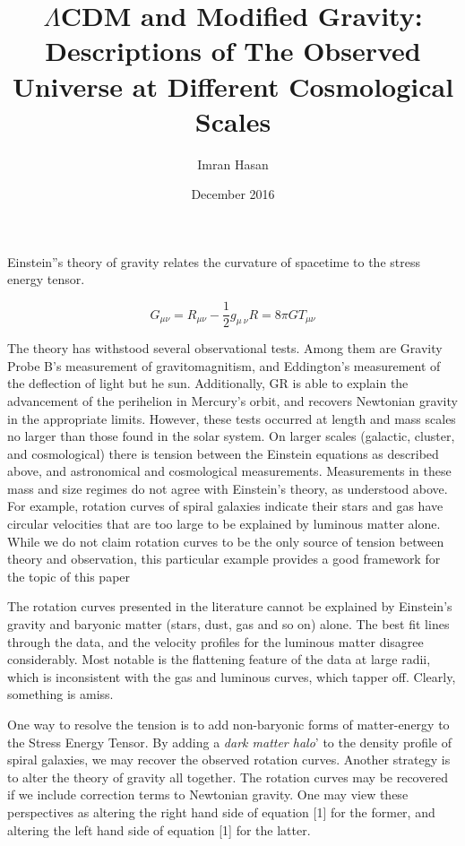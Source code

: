\documentclass[12pt]{article}
\begin{document}
\title{$\Lambda$CDM and Modified Gravity: Descriptions of The Observed Universe at Different Cosmological Scales}
\author{Imran Hasan}
\date{December 2016}
\maketitle


Einstein''s theory of gravity relates the curvature of spacetime to the stress energy tensor.

$$G_{\mu\nu} = R_{\mu \nu} - \frac{1}{2} g_{\mu\ \nu} R = 8\pi GT_{\mu \nu}$$

The theory has withstood several observational tests. Among them are Gravity Probe B's measurement of gravitomagnitism, and Eddington's measurement of the deflection of light but he sun. Additionally, GR is able to explain the advancement of the perihelion in Mercury's orbit, and recovers Newtonian gravity in the appropriate limits. However, these tests occurred at length and mass scales no larger than those found in the solar system. On larger scales (galactic, cluster, and cosmological) there is tension between the Einstein equations as described above, and astronomical and cosmological measurements. Measurements in these mass and size regimes do not agree with Einstein's theory, as understood above. For example, rotation curves of spiral galaxies indicate their stars and gas have circular velocities that are too large to be explained by luminous matter alone. While we do not claim rotation curves to be the only source of tension between theory and observation, this particular example provides a good framework for the topic of this paper


The rotation curves presented in the literature cannot be explained by Einstein's gravity and baryonic matter (stars, dust, gas and so on) alone. The best fit lines through the data, and the velocity profiles for the luminous matter disagree considerably. Most notable is the flattening feature of the data at large radii, which is inconsistent with the gas and luminous curves, which tapper off. Clearly, something is amiss. 

One way to resolve the tension is to add non-baryonic forms of matter-energy to the Stress Energy Tensor. By adding a \emph{dark matter halo}' to the density profile of spiral galaxies, we may recover the observed rotation curves. Another strategy is to alter the theory of gravity all together. The rotation curves may be recovered if we include correction terms to Newtonian gravity. One may view these perspectives as altering the right hand side of equation [1] for the former, and altering the left hand side of equation [1] for the latter. 
\end{document}
